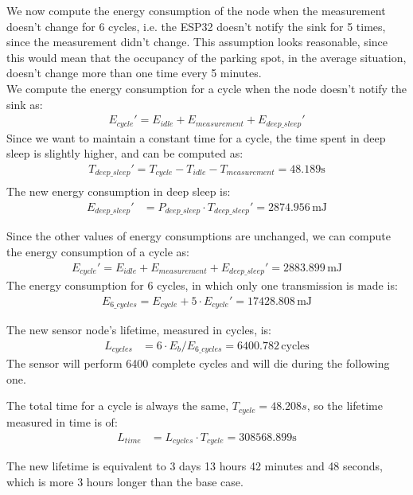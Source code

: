 We now compute the energy consumption of the node when the measurement doesn't change for 6 cycles, i.e. the ESP32 doesn't notify the sink for 5 times, since the measurement didn't change. This assumption looks reasonable, since this would mean that the occupancy of the parking spot, in the average situation, doesn't change more than one time every 5 minutes.\\
We compute the energy consumption for a cycle when the node doesn't notify the sink as:
\begin{align*}
E_{cycle}' = E_{idle} + E_{measurement} + E_{deep\_sleep}'
\end{align*}
Since we want to maintain a constant time for a cycle, the time spent in deep sleep is slightly higher, and can be computed as:
\begin{align*}
	T_{deep\_sleep}' = T_{cycle} - T_{idle} - T_{measurement} = 48.189 \text{s}\\
\end{align*}
The new energy consumption in deep sleep is:
\begin{align*}
	E_{deep\_sleep}' &= P_{deep\_sleep} \cdot T_{deep\_sleep}' = 2874.956\,\text{mJ} 
\end{align*}

Since the other values of energy consumptions are unchanged, we can compute the energy consumption of a cycle as:
\begin{align*}
	E_{cycle}' = E_{idle} + E_{measurement} + E_{deep\_sleep}' = 2883.899\,\text{mJ} 
\end{align*}
The energy consumption for 6 cycles, in which only one transmission is made is:
\begin{align*}
	E_{6\_cycles} = E_{cycle} + 5 \cdot E_{cycle}' = 17428.808\,\text{mJ} 
\end{align*}

The new sensor node's lifetime, measured in cycles, is:
\begin{align*}
	L_{cycles}&= 6 \cdot E_{b} / E_{6\_cycles} = 6400.782 \,\text{cycles} 
\end{align*}
The sensor will perform 6400 complete cycles and will die during the following one.

The total time for a cycle is always the same, $T_{cycle} = 48.208 s$, so the lifetime measured in time is of:
\begin{align*}
	L_{time}&= L_{cycles} \cdot T_{cycle} = 308568.899 \text{s}
\end{align*}

The new lifetime is equivalent to 3 days 13 hours 42 minutes and 48 seconds, which is more 3 hours longer than the base case.

